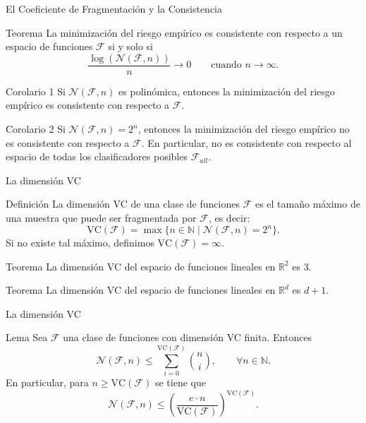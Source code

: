 \documentclass[aspectratio=169, 10pt]{beamer}
\begin{document}
\begin{frame}{El Coeficiente de Fragmentación y la Consistencia}
  \begin{block}{Teorema}
    \large
    La minimización del riesgo empírico es consistente con respecto a un espacio de funciones $\mathcal{F}$ si y solo si
    \[
    \frac{\log\left(\mathcal{N}(\mathcal{F}, n)\right)}{n} \rightarrow 0 \qquad \text{cuando } n \to \infty.
    \]
\end{block}
\pause
  \begin{block}{Corolario 1}
    Si $\mathcal{N}(\mathcal{F}, n)$ es polinómica, entonces la minimización del riesgo empírico es consistente con respecto a $\mathcal{F}$.\\
\end{block}
\pause
\begin{block}{Corolario 2}
    Si $\mathcal{N}(\mathcal{F}, n)=2^n$, entonces la minimización del riesgo empírico no es consistente con respecto a $\mathcal{F}$. En
    particular, no es consistente con respecto al espacio de todas los clasificadores posibles $\mathcal{F}_{all}$.
\end{block}
\end{frame}

\begin{frame}{La dimensión VC}
\begin{block}{Definición}
  \large
    La dimensión VC de una clase de funciones \(\mathcal{F}\) es el tamaño máximo de una muestra que puede ser fragmentada por \(\mathcal{F}\), es decir:
    \[
    \text{VC}(\mathcal{F}) = \max \{n \in \mathbb{N} \mid \mathcal{N}(\mathcal{F}, n) = 2^n\}.
    \]
    Si no existe tal máximo, definimos \(\text{VC}(\mathcal{F}) = \infty\).
\end{block}
\pause
\begin{block}{Teorema}
  La dimensión VC del espacio de funciones lineales en \(\mathbb{R}^2\) es \(3\).
\end{block}

\pause


\begin{block}{Teorema}
  La dimensión VC del espacio de funciones lineales en \(\mathbb{R}^d\) es \(d+1\).
\end{block}

\end{frame}

\begin{frame}{La dimensión VC}
  \begin{block}{Lema}
    \Large
      Sea $\mathcal{F}$ una clase de funciones con dimensión VC finita. Entonces
    \[
    \mathcal{N}(\mathcal{F}, n) \leq \sum_{i=0}^{\text{VC}(\mathcal{F})} \binom{n}{i} , \qquad \forall n \in \mathbb{N}.
    \]
    En particular, para $n\geq \text{VC}(\mathcal{F})$ se tiene que
    \[
    \mathcal{N}(\mathcal{F}, n) \leq \left(\frac{e\cdot n}{\text{VC}(\mathcal{F})}\right)^{\text{VC}(\mathcal{F})}.
    \]
    \end{block}
\end{frame}
\end{document}
